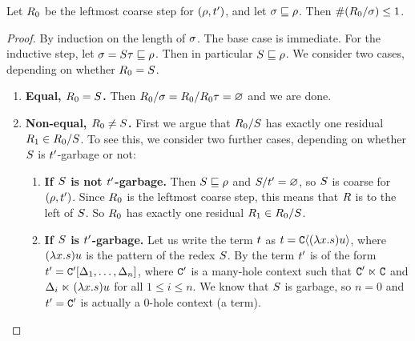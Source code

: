 \begin{lemma}
Let $R_0$ be the leftmost coarse step for $(\rho,t')$,
and let $\sigma \sqsubseteq \rho$.
Then $\#(R_0/\sigma) \leq 1$.
\end{lemma}
\begin{proof}
By induction on the length of $\sigma$. The base case is immediate.
For the inductive step, let $\sigma = S \tau \sqsubseteq \rho$.
Then in particular $S \sqsubseteq \rho$.
We consider two cases, depending on whether $R_0 = S$.
\begin{enumerate}
\item {\bf Equal, $R_0 = S$.}
  Then $R_0/\sigma = R_0/R_0\tau = \varnothing$ and we are done.
\item {\bf Non-equal, $R_0 \neq S$.}
  First we argue that $R_0/S$ has exactly one residual $R_1 \in R_0/S$.
  To see this, we consider two further cases, depending on whether
  $S$ is $t'$-garbage or not:
  \begin{enumerate}
  \item {\bf If $S$ is not $t'$-garbage.}
    Then $S \sqsubseteq \rho$ and $S/t' = \varnothing$, so $S$ is coarse for $(\rho,t')$.
    Since $R_0$ is the leftmost coarse step, this means that $R$ is to the left of $S$.
    So $R_0$ has exactly one residual $R_1 \in R_0/S$.
  \item {\bf If $S$ is $t'$-garbage.}
    Let us write the term $t$ as $t = \mathtt{C}\langle(\lambda x. s)u\rangle$, where
    $(\lambda x. s)u$ is the pattern of the redex $S$.
    By 
    the term $t'$ is of the form $t' = \mathtt{C}'[\Delta_1,\hdots,\Delta_n]$,
    where $\mathtt{C}'$ is a many-hole context such that $\mathtt{C}' \mathrel{\ltimes} \mathtt{C}$
    and $\Delta_i \mathrel{\ltimes} (\lambda x. s)u$ for all $1 \leq i \leq n$.
    We know that $S$ is garbage, so $n = 0$ and $t' = \mathtt{C}'$ is actually
    a $0$-hole context (\ie a term).


\end{enumerate}
\end{enumerate}
\end{proof}
